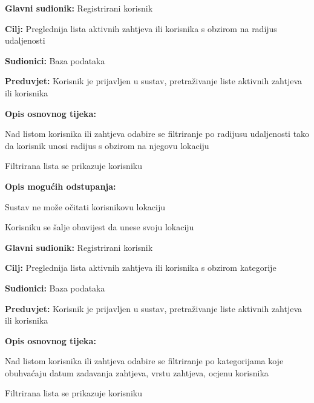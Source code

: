 \noindent {}
\begin{packed_item}
	\item \textbf{Glavni sudionik: } Registrirani korisnik
	\item  \textbf{Cilj:} Preglednija lista aktivnih zahtjeva ili korisnika s obzirom na radijus udaljenosti 
	\item  \textbf{Sudionici:} Baza podataka
	\item  \textbf{Preduvjet:} Korisnik je prijavljen u sustav, pretraživanje liste aktivnih zahtjeva ili korisnika
	\item  \textbf{Opis osnovnog tijeka:}
	\item[] \begin{packed_enum}
		\item Nad listom korisnika ili zahtjeva odabire se filtriranje po radijusu udaljenosti tako da korisnik unosi radijus s obzirom na njegovu lokaciju
		\item Filtrirana lista se prikazuje korisniku
	\end{packed_enum}
	\item  \textbf{Opis mogućih odstupanja:}
	\item[] \begin{packed_item}
		\item[1.a] 	Sustav ne može očitati korisnikovu lokaciju
		\item[] \begin{packed_enum}
			\item Korisniku se šalje obavijest da unese svoju lokaciju
		\end{packed_enum}
	\end{packed_item}
\end{packed_item}

\noindent {}
\begin{packed_item}
	\item \textbf{Glavni sudionik: } Registrirani korisnik
	\item  \textbf{Cilj:} Preglednija lista aktivnih zahtjeva ili korisnika s obzirom kategorije 
	\item  \textbf{Sudionici:} Baza podataka
	\item  \textbf{Preduvjet:} Korisnik je prijavljen u sustav, pretraživanje liste aktivnih zahtjeva ili korisnika
	\item  \textbf{Opis osnovnog tijeka:}
	\item[] \begin{packed_enum}
		\item Nad listom korisnika ili zahtjeva odabire se filtriranje po kategorijama koje obuhvaćaju datum zadavanja zahtjeva, vrstu zahtjeva, ocjenu korisnika
		\item Filtrirana lista se prikazuje korisniku
	\end{packed_enum}
\end{packed_item}

